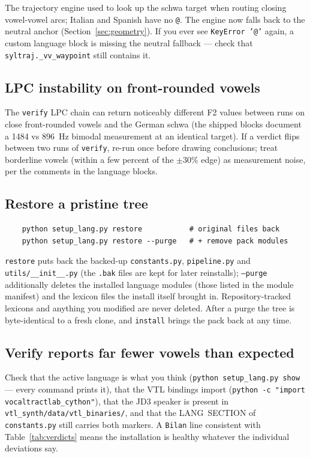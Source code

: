 \documentclass[11pt,a4paper]{article}
\newcommand{\code}[1]{\texttt{#1}}
\newcommand{\sampkey}[1]{\texttt{#1}}
\begin{document}
The trajectory engine used to look up the schwa target when routing
closing vowel-vowel arcs; Italian and Spanish have no
\sampkey{@}. The engine now falls back to the neutral anchor
(Section~\ref{sec:geometry}). If you ever see \code{KeyError '@'}
again, a custom language block is missing the neutral fallback ---
check that \code{syltraj.\_vv\_waypoint} still contains it.

\subsection{LPC instability on front-rounded vowels}

The \code{verify} LPC chain can return noticeably different F2 values
between runs on close front-rounded vowels and the German schwa (the
shipped blocks document a 1484 vs 896~Hz bimodal measurement at an
identical target). If a verdict flips between two runs of
\code{verify}, re-run once before drawing conclusions; treat
borderline vowels (within a few percent of the $\pm30\%$ edge) as
measurement noise, per the comments in the language blocks.

\subsection{Restore a pristine tree}

\begin{verbatim}
    python setup_lang.py restore           # original files back
    python setup_lang.py restore --purge   # + remove pack modules
\end{verbatim}

\code{restore} puts back the backed-up \code{constants.py},
\code{pipeline.py} and \code{utils/\_\_init\_\_.py} (the
\code{.bak} files are kept for later reinstalls); \code{--purge}
additionally deletes the installed language modules (those listed in
the module manifest) and the lexicon files the install itself brought
in. Repository-tracked lexicons and anything you modified are never
deleted. After a purge the tree is byte-identical to a fresh clone,
and \code{install} brings the pack back at any time.

\subsection{Verify reports far fewer vowels than expected}

Check that the active language is what you think
(\code{python setup\_lang.py show} --- every command prints it), that
the VTL bindings import (\code{python -c "import
vocaltractlab\_cython"}), that the JD3 speaker is present in
\code{vtl\_synth/data/vtl\_binaries/}, and that the LANG~SECTION of
\code{constants.py} still carries both markers. A
\code{Bilan} line consistent with Table~\ref{tab:verdicts} means the
installation is healthy whatever the individual deviations say.
\end{document}

